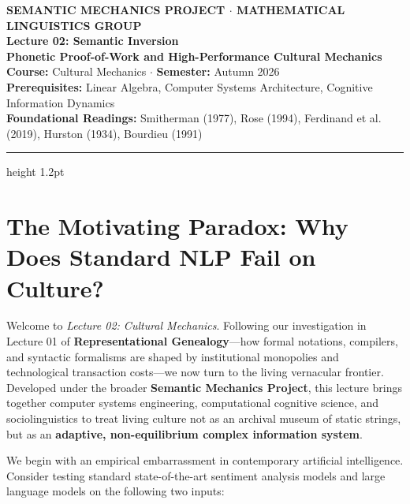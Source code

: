 \documentclass[11pt,letterpaper]{article}
\begin{document}
\begin{center}
    {\small\sffamily\bfseries\color{darkslate} SEMANTIC MECHANICS PROJECT $\cdot$ MATHEMATICAL LINGUISTICS GROUP}\\[0.7em]
    {\LARGE\bfseries\color{primaryblue} Lecture 02: Semantic Inversion}\\[0.35em]
    {\Large\bfseries\color{primaryblue} Phonetic Proof-of-Work and High-Performance Cultural Mechanics}\\[0.4em]
    {\normalsize\sffamily\color{darkslate} \textbf{Course:} Cultural Mechanics $\cdot$ \textbf{Semester:} Autumn 2026}\\[0.25em]
    {\small\sffamily\color{darkslate!80} \textbf{Prerequisites:} Linear Algebra, Computer Systems Architecture, Cognitive Information Dynamics}\\[0.25em]
    {\small\sffamily\color{darkslate!80} \textbf{Foundational Readings:} Smitherman (1977), Rose (1994), Ferdinand et al. (2019), Hurston (1934), Bourdieu (1991)}
\end{center}
\vspace{0.1em}
\hrule height 1.2pt \vspace{0.7em}

\section{The Motivating Paradox: Why Does Standard NLP Fail on Culture?}

Welcome to \textit{Lecture 02: Cultural Mechanics}. Following our investigation in Lecture 01 of \textbf{Representational Genealogy}---how formal notations, compilers, and syntactic formalisms are shaped by institutional monopolies and technological transaction costs---we now turn to the living vernacular frontier. Developed under the broader \textbf{Semantic Mechanics Project}, this lecture brings together computer systems engineering, computational cognitive science, and sociolinguistics to treat living culture not as an archival museum of static strings, but as an \textbf{adaptive, non-equilibrium complex information system}.

We begin with an empirical embarrassment in contemporary artificial intelligence. Consider testing standard state-of-the-art sentiment analysis models and large language models on the following two inputs:
\end{document}
